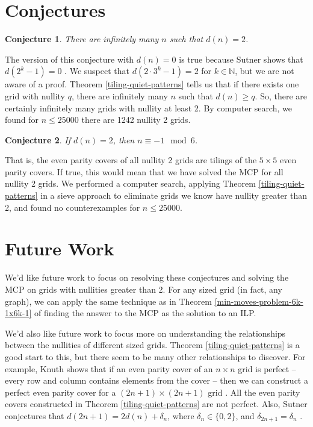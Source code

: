 \documentclass[a4paper]{article}
\newtheorem{conjecture}{Conjecture}
\newcommand{\N}{\mathbb{N}}
\begin{document}
	\section{Conjectures}
	\begin{conjecture}\label{infinite-nullity-2}
		There are infinitely many $n$ such that $d(n) = 2$.
	\end{conjecture}
	The version of this conjecture with $d(n) = 0$ is true because Sutner shows that $d(2^k - 1) = 0$ \cite{Sutner1989}.
	We suspect that $d(2 \cdot 3^k - 1) = 2$ for $k \in \N$, but we are not aware of a proof.
	Theorem \ref{tiling-quiet-patterns} tells us that if there exists one grid with nullity $q$, there are infinitely many $n$ such that $d(n) \geq q$.
	So, there are certainly infinitely many grids with nullity at least 2.
	By computer search, we found for $n \leq 25000$ there are 1242 nullity 2 grids.
	
	\begin{conjecture}\label{all-nullity2-conj}
		If $d(n) = 2$, then $n \equiv -1 \mod 6$.
	\end{conjecture}
	That is, the even parity covers of all nullity 2 grids are tilings of the $5 \times 5$ even parity covers.
	If true, this would mean that we have solved the MCP for all nullity 2 grids.
	We performed a computer search, applying Theorem \ref{tiling-quiet-patterns} in a sieve approach to eliminate grids we know have nullity greater than 2, and found no counterexamples for $n \leq 25000$.
	
	\section{Future Work}
	We'd like future work to focus on resolving these conjectures and solving the MCP on grids with nullities greater than 2.
	For any sized grid (in fact, any graph), we can apply the same technique as in Theorem \ref{min-moves-problem-6k-1x6k-1} of finding the answer to the MCP as the solution to an ILP.
	
	We'd also like future work to focus more on understanding the relationships between the nullities of different sized grids.
	Theorem \ref{tiling-quiet-patterns} is a good start to this, but there seem to be many other relationships to discover.
	For example, Knuth shows that if an even parity cover of an $n \times n$ grid is perfect -- every row and column contains elements from the cover -- then we can construct a perfect even parity cover for a $(2n+1) \times (2n+1)$ grid \cite{Knuth_AOCP4A}.
	All the even parity covers constructed in Theorem \ref{tiling-quiet-patterns} are not perfect.
	Also, Sutner conjectures that $d(2n+1) = 2d(n) + \delta_n$, where $\delta_n \in \{0,2\}$, and $\delta_{2n+1} = \delta_n$ \cite{Sutner1989}.
	
	\newpage
	
	
\end{document}
